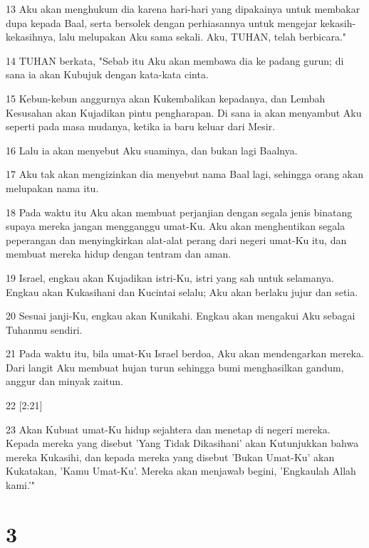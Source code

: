 \par 13 Aku akan menghukum dia karena hari-hari yang dipakainya untuk membakar dupa kepada Baal, serta bersolek dengan perhiasannya untuk mengejar kekasih-kekasihnya, lalu melupakan Aku sama sekali. Aku, TUHAN, telah berbicara."
\par 14 TUHAN berkata, "Sebab itu Aku akan membawa dia ke padang gurun; di sana ia akan Kubujuk dengan kata-kata cinta.
\par 15 Kebun-kebun anggurnya akan Kukembalikan kepadanya, dan Lembah Kesusahan akan Kujadikan pintu pengharapan. Di sana ia akan menyambut Aku seperti pada masa mudanya, ketika ia baru keluar dari Mesir.
\par 16 Lalu ia akan menyebut Aku suaminya, dan bukan lagi Baalnya.
\par 17 Aku tak akan mengizinkan dia menyebut nama Baal lagi, sehingga orang akan melupakan nama itu.
\par 18 Pada waktu itu Aku akan membuat perjanjian dengan segala jenis binatang supaya mereka jangan mengganggu umat-Ku. Aku akan menghentikan segala peperangan dan menyingkirkan alat-alat perang dari negeri umat-Ku itu, dan membuat mereka hidup dengan tentram dan aman.
\par 19 Israel, engkau akan Kujadikan istri-Ku, istri yang sah untuk selamanya. Engkau akan Kukasihani dan Kucintai selalu; Aku akan berlaku jujur dan setia.
\par 20 Sesuai janji-Ku, engkau akan Kunikahi. Engkau akan mengakui Aku sebagai Tuhanmu sendiri.
\par 21 Pada waktu itu, bila umat-Ku Israel berdoa, Aku akan mendengarkan mereka. Dari langit Aku membuat hujan turun sehingga bumi menghasilkan gandum, anggur dan minyak zaitun.
\par 22 [2:21]
\par 23 Akan Kubuat umat-Ku hidup sejahtera dan menetap di negeri mereka. Kepada mereka yang disebut 'Yang Tidak Dikasihani' akan Kutunjukkan bahwa mereka Kukasihi, dan kepada mereka yang disebut 'Bukan Umat-Ku' akan Kukatakan, 'Kamu Umat-Ku'. Mereka akan menjawab begini, 'Engkaulah Allah kami.'"

\chapter{3}

